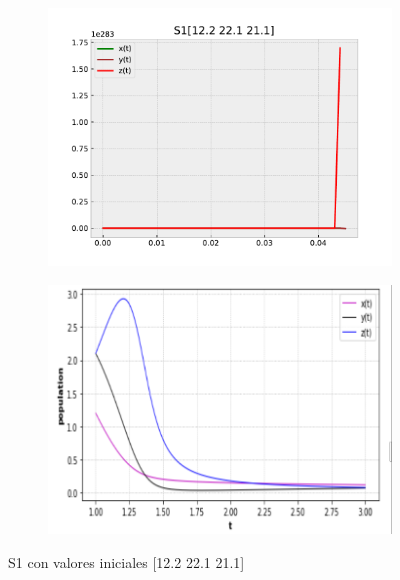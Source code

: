 \documentclass{wscpaperproc}
\theoremstyle{wsc}
\begin{document}
\begin{figure}[h]
	\centering
	\begin{subfigure}[b]{0.5\textwidth}
		\centering
		\includegraphics[width=\textwidth]{Simulations/S1[12.2 22.1 21.1].pdf}
	
		\label{fig:comparativa31}
	\end{subfigure}%
	\begin{subfigure}[b]{0.5\textwidth}
		\centering
		\includegraphics[width=\textwidth]{GraficasPaper/S1[3].png}
		\label{fig:comparativa32}
	\end{subfigure}
	\caption{S1 con valores iniciales [12.2 22.1 21.1]}

	\label{fig:comparacion3}
\end{figure}
\end{document}

